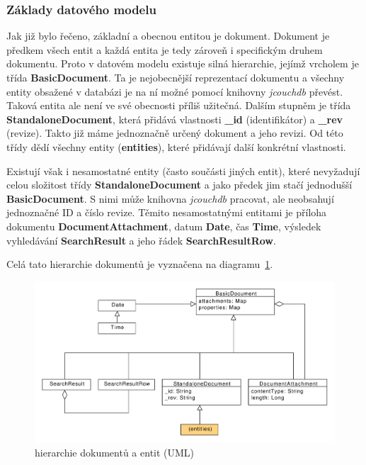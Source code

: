 \subsubsection{Základy datového modelu}

Jak již bylo řečeno, základní a obecnou entitou je dokument. Dokument je předkem všech entit a každá entita je tedy zároveň i specifickým druhem dokumentu. Proto v datovém modelu existuje silná hierarchie, jejímž vrcholem je třída {\bf BasicDocument}. Ta je nejobecnější reprezentací dokumentu a všechny entity obsažené v databázi je na ní možné pomocí knihovny {\em jcouchdb} převést. Taková entita ale není ve své obecnosti příliš užitečná. Dalším stupněm je třída {\bf StandaloneDocument}, která přidává vlastnosti {\bf \_id} (identifikátor) a {\bf \_rev} (revize). Takto již máme jednoznačně určený dokument a jeho revizi. Od této třídy dědí všechny entity ({\bf entities}), které přidávají další konkrétní vlastnosti. 

Existují však i nesamostatné entity (často součásti jiných entit), které nevyžadují celou složitost třídy {\bf StandaloneDocument} a jako předek jim stačí jednodušší {\bf BasicDocument}. S nimi může knihovna {\em jcouchdb} pracovat, ale neobsahují jednoznačné ID a číslo revize. Těmito nesamostatnými entitami je příloha dokumentu {\bf DocumentAttachment}, datum {\bf Date}, čas {\bf Time}, výsledek vyhledávání {\bf SearchResult} a jeho řádek {\bf SearchResultRow}. 

Celá tato hierarchie dokumentů je vyznačena na diagramu~\ref{fig:uml_document}.

\begin{figure}
\centering
\includegraphics[width=\textwidth]{uml_document.pdf}
\caption{hierarchie dokumentů a entit (UML)}
\label{fig:uml_document}
\end{figure}

